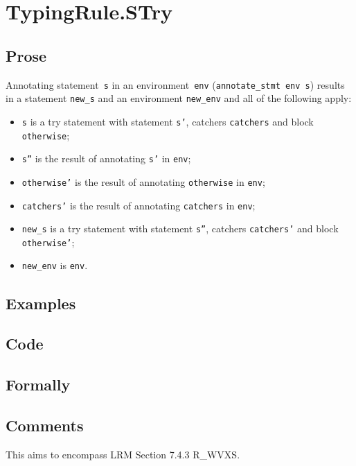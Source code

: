 \documentclass{book}
\begin{document}
\section{TypingRule.STry \label{sec:TypingRule.STry}}

  \subsection{Prose}
Annotating statement~\texttt{s} in an environment~\texttt{env}
(\texttt{annotate\_stmt env s}) results in a statement \texttt{new\_s} and an
environment \texttt{new\_env} and all of the following apply:
   \begin{itemize}
   \item \texttt{s} is a try statement with statement \texttt{s'}, catchers \texttt{catchers} and block \texttt{otherwise};
   \item \texttt{s''} is the result of annotating \texttt{s'} in \texttt{env};
   \item \texttt{otherwise'} is the result of annotating \texttt{otherwise} in \texttt{env};
   \item \texttt{catchers'} is the result of annotating \texttt{catchers} in \texttt{env};
   \item \texttt{new\_s} is a try statement with statement \texttt{s''}, catchers \texttt{catchers'} and block \texttt{otherwise'};
   \item \texttt{new\_env} is \texttt{env}.
   \end{itemize}

  \subsection{Examples}

  \subsection{Code}

  \subsection{Formally}

  \subsection{Comments}
    This aims to encompass LRM Section 7.4.3 R\_WVXS.
\end{document}
